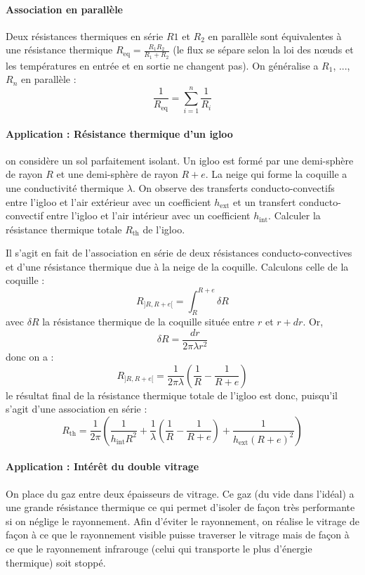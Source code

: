 \documentclass[french]{book}
\theoremstyle{plain}
\theoremstyle{definition}
\theoremstyle{remark}
\begin{document}
\paragraph{Association en parallèle} Deux résistances thermiques en série $R1$ et $R_2$ en parallèle sont équivalentes à une résistance thermique $R_\text{eq}=\displaystyle\frac{R_1R_2}{R_1+R_2}$ (le flux se sépare selon la loi des nœuds et les températures en entrée et en sortie ne changent pas). On généralise a $R_1$, ..., $R_n$ en parallèle : $$\frac{1}{R_\text{eq}}=\sum_{i=1}^{n}\frac{1}{R_i}$$
\paragraph{Application : Résistance thermique d'un igloo} on considère un sol parfaitement isolant. Un igloo est formé par une demi-sphère de rayon $R$ et une demi-sphère de rayon $R+e$. La neige qui forme la coquille a une conductivité thermique $\lambda$. On observe des transferts conducto-convectifs entre l'igloo et l'air extérieur avec un coefficient $h_\text{ext}$ et un transfert conducto-convectif entre l'igloo et l'air intérieur avec un coefficient $h_\text{int}$. Calculer la résistance thermique totale $R_\text{th}$ de l'igloo. \\ \par Il s'agit en fait de l'association en série de deux résistances conducto-convectives et d'une résistance thermique due à la neige de la coquille. Calculons celle de la coquille : $$R_{]R,R+e[}=\int_{R}^{R+e}\delta R$$ avec $\delta R$ la résistance thermique de la coquille située entre $r$ et $r+dr$. Or, $$\delta R=\frac{dr}{2\pi\lambda r^2}$$ donc on a : $$R_{]R,R+e[}=\frac{1}{2\pi\lambda}\left(\frac{1}{R}-\frac{1}{R+e}\right)$$ le résultat final de la résistance thermique totale de l'igloo est donc, puisqu'il s'agit d'une association en série : $$R_\text{th}=\frac{1}{2\pi}\left(\frac{1}{h_\text{int}R^2}+\frac{1}{\lambda}\left(\frac{1}{R}-\frac{1}{R+e}\right)+\frac{1}{h_\text{ext}(R+e)^2}\right)$$
\paragraph{Application : Intérêt du double vitrage} On place du gaz entre deux épaisseurs de vitrage. Ce gaz (du vide dans l'idéal) a une grande résistance thermique ce qui permet d'isoler de façon très performante si on néglige le rayonnement. Afin d'éviter le rayonnement, on réalise le vitrage de façon à ce que le rayonnement visible puisse traverser le vitrage mais de façon à ce que le rayonnement infrarouge (celui qui transporte le plus d'énergie thermique) soit stoppé.
\end{document}
